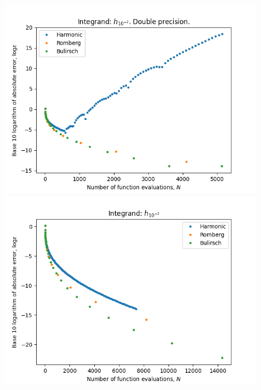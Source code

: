 \begin{figure}[H]
\centering
\begin{minipage}{0.45\textwidth}
\centering
\includegraphics[scale=0.45]{../results/romberg_plots/h_hundredth.png}
\end{minipage}
\begin{minipage}{0.45\textwidth}
\centering
\includegraphics[scale=0.45]{../results/romberg_plots/h_hundredth_hp.png}
\end{minipage}
\end{figure}

